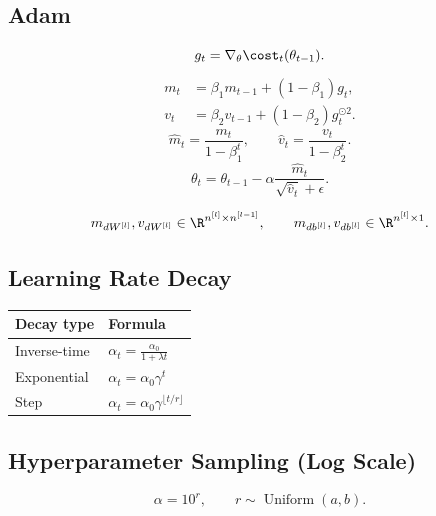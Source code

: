 \subsection{Adam}

\[
g_t = \nabla_{\theta}\cost_t(\theta_{t-1}).
\]
\[
\begin{aligned}
m_t
&=
\beta_1 m_{t-1}
+
(1-\beta_1)g_t,\\
v_t
&=
\beta_2 v_{t-1}
+
(1-\beta_2)g_t^{\odot 2}.
\end{aligned}
\]
\[
\hat{m}_t
=
\frac{m_t}{1-\beta_1^t},
\qquad
\hat{v}_t
=
\frac{v_t}{1-\beta_2^t}.
\]
\[
\theta_t
=
\theta_{t-1}
-
\alpha
\frac{\hat{m}_t}{\sqrt{\hat{v}_t}+\epsilon}.
\]

\[
m_{dW^{[l]}}, v_{dW^{[l]}}
\in
\R^{n^{[l]} \times n^{[l-1]}},
\qquad
m_{db^{[l]}}, v_{db^{[l]}}
\in
\R^{n^{[l]} \times 1}.
\]

\subsection{Learning Rate Decay}

\begin{center}
\begin{tabular}{ll}
\toprule
Decay type & Formula \\
\midrule
Inverse-time &
\(\displaystyle \alpha_t=\frac{\alpha_0}{1+\lambda t}\) \\
\addlinespace
Exponential &
\(\displaystyle \alpha_t=\alpha_0\gamma^t\) \\
\addlinespace
Step &
\(\displaystyle \alpha_t=\alpha_0\gamma^{\lfloor t/r \rfloor}\) \\
\bottomrule
\end{tabular}
\end{center}

\subsection{Hyperparameter Sampling (Log Scale)}

\[
\alpha = 10^r,
\qquad
r \sim \operatorname{Uniform}(a,b).
\]

